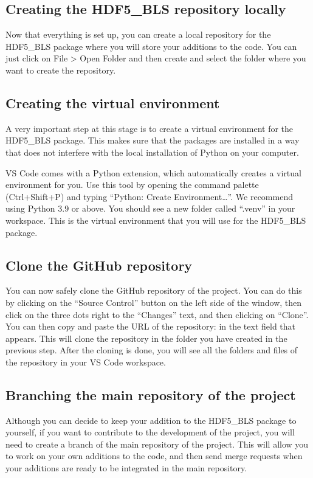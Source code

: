 \documentclass[letterpaper,10pt,english]{sphinxmanual}
\begin{document}
\subsection{Creating the HDF5\_BLS repository locally}
\label{\detokenize{source/developer/setup:creating-the-hdf5-bls-repository-locally}}
\sphinxAtStartPar
Now that everything is set up, you can create a local repository for the HDF5\_BLS package where you will store your additions to the code. You can just click on File \textgreater{} Open Folder and then create and select the folder where you want to create the repository.


\subsection{Creating the virtual environment}
\label{\detokenize{source/developer/setup:creating-the-virtual-environment}}
\sphinxAtStartPar
A very important step at this stage is to create a virtual environment for the HDF5\_BLS package. This makes sure that the packages are installed in a way that does not interfere with the local installation of Python on your computer.

\sphinxAtStartPar
VS Code comes with a Python extension, which automatically creates a virtual environment for you. Use this tool by opening the command palette (Ctrl+Shift+P) and typing “Python: Create Environment…”. We recommend using Python 3.9 or above. You should see a new folder called “.venv” in your workspace. This is the virtual environment that you will use for the HDF5\_BLS package.


\subsection{Clone the GitHub repository}
\label{\detokenize{source/developer/setup:clone-the-github-repository}}
\sphinxAtStartPar
You can now safely clone the GitHub repository of the project. You can do this by clicking on the “Source Control” button on the left side of the window, then click on the three dots right to the “Changes” text, and then clicking on “Clone”. You can then copy and paste the URL of the repository:  in the text field that appears. This will clone the repository in the folder you have created in the previous step. After the cloning is done, you will see all the folders and files of the repository in your VS Code workspace.


\subsection{Branching the main repository of the project}
\label{\detokenize{source/developer/setup:branching-the-main-repository-of-the-project}}
\sphinxAtStartPar
Although you can decide to keep your addition to the HDF5\_BLS package to yourself, if you want to contribute to the development of the project, you will need to create a branch of the main repository of the project. This will allow you to work on your own additions to the code, and then send merge requests when your additions are ready to be integrated in the main repository.
\end{document}
